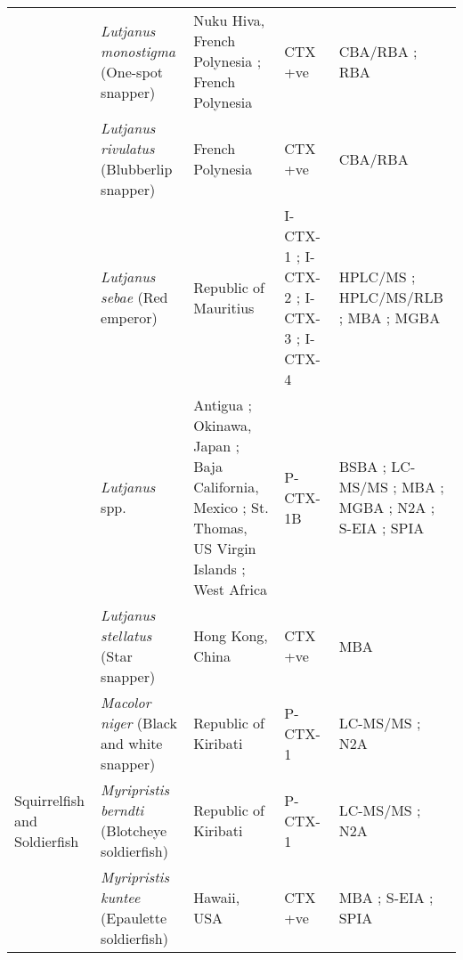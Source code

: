 \documentclass[12pt]{article}
\begin{document}
\begin{longtable}{ | p{2cm} | p{3cm} | p{4.5cm} | p{2cm} | p{3cm} | }
	& \emph{Lutjanus monostigma} (One-spot snapper)& Nuku Hiva, French Polynesia \cite{darius2007ciguatera}; French Polynesia \cite{chinain2014mail} & CTX +ve \cite{darius2007ciguatera,chinain2014mail} & CBA/RBA \cite{chinain2014mail}; RBA \cite{darius2007ciguatera} \\
	& \emph{Lutjanus rivulatus} (Blubberlip snapper) & French Polynesia \cite{chinain2014mail} & CTX +ve \cite{chinain2014mail} & CBA/RBA \cite{chinain2014mail} \\
	& \emph{Lutjanus sebae} (Red emperor) & Republic of Mauritius \cite{hamilton2002multiple,hamilton2002isolation} & I-CTX-1 \cite{hamilton2002multiple,hamilton2002isolation}; I-CTX-2 \cite{hamilton2002multiple,hamilton2002isolation}; I-CTX-3 \cite{hamilton2002multiple,hamilton2002isolation}; I-CTX-4 \cite{hamilton2002multiple,hamilton2002isolation} & HPLC/MS \cite{hamilton2002multiple,hamilton2002isolation}; HPLC/MS/RLB \cite{hamilton2002multiple,hamilton2002isolation}; MBA \cite{hamilton2002multiple,hamilton2002isolation}; MGBA \cite{hamilton2002multiple,hamilton2002isolation} \\ %
	& \emph{Lutjanus} spp. & Antigua \cite{hokama1990simplified}; Okinawa, Japan \cite{yogi2011detailed}; Baja California, Mexico \cite{parrilla1992outbreaks}; St. Thomas, US Virgin Islands \cite{granade1976ciguatera}; West Africa \cite{bienfang2008ciguatera} & P-CTX-1B \cite{yogi2011detailed} & BSBA \cite{granade1976ciguatera}; LC-MS/MS \cite{yogi2011detailed}; MBA \cite{parrilla1992outbreaks}; MGBA \cite{granade1976ciguatera}; N2A \cite{bienfang2008ciguatera}; S-EIA \cite{hokama1990simplified}; SPIA \cite{hokama1990simplified} \\
	& \emph{Lutjanus stellatus} (Star snapper) & Hong Kong, China \cite{wong2008features} & CTX +ve \cite{wong2008features} & MBA \cite{wong2008features} \\
	& \emph{Macolor niger} (Black and white snapper) & Republic of Kiribati \cite{mak2013pacific} & P-CTX-1 \cite{mak2013pacific} & LC-MS/MS \cite{mak2013pacific}; N2A \cite{mak2013pacific} \\
	\hline
	Squirrelfish and Soldierfish & \emph{Myripristis berndti} (Blotcheye soldierfish) & Republic of Kiribati \cite{mak2013pacific} & P-CTX-1 \cite{mak2013pacific} & LC-MS/MS \cite{mak2013pacific}; N2A \cite{mak2013pacific} \\
	& \emph{Myripristis kuntee} (Epaulette soldierfish) & Hawaii, USA \cite{hokama1993evaluation} & CTX +ve \cite{hokama1993evaluation} & MBA \cite{hokama1993evaluation}; S-EIA \cite{hokama1993evaluation}; SPIA \cite{hokama1993evaluation}\\

\end{longtable}
\end{document}
